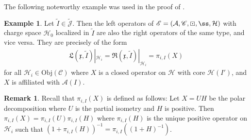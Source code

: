 \documentclass[11pt,b5paper,notitlepage]{article}
\theoremstyle{definition}
\newtheorem{eg}[df]{Example}
\newtheorem{rem}[df]{Remark}
\theoremstyle{plain}
\newcommand{\fk}{\mathfrak}
\newcommand{\mc}{\mathcal}
\newcommand{\wtd}{\widetilde}
\newcommand{\scr}{\mathscr}
\newcommand{\Jtd}{\widetilde{\mathcal J}}
\newcommand{\xk}{\mathfrak x}
\newcommand{\yk}{\mathfrak y}
\newcommand{\pr}{\mathrm {pr}}
\newcommand{\Obj}{\mathrm{Obj}}
\numberwithin{equation}{section}
\begin{document}
\begin{comment}
\begin{rem}
From the proof of Thm. \ref{lb7}, we see that if $(\fk L,\xk,\wtd I,\mc H_i)$ resp. $(\fk R,\yk,\wtd J,\mc H_j)$ is a left resp. right operator of $\scr E=(\mc A,\scr C,\boxdot,\ss,\mc H)$, and if we let $\xi=\fk L(\xk,\wtd I)\Omega$ resp. $\eta=\fk R(\yk,\wtd J)\Omega$, then $\xi\in\mc H_i^\pr(I)$ resp. $\eta\in\mc H_j^\pr(J)$, and for every $\mc H_k\in\Obj(\scr C)$ we have
\begin{align*}
\Psi_{i,k}\fk L(\xk,\wtd I)|_{\mc H_k}=\scr L^\boxtimes(\xi,\wtd I)|_{\mc H_k}\qquad  \Psi_{j,k}\fk R(\yk,\wtd J)|_{\mc H_k}=\scr R^\boxtimes(\eta,\wtd J)|_{\mc H_k}
\end{align*}
where $\Psi$ is the Connes tensorator (cf. Def. \ref{lb1}) and $\scr L^\boxtimes$ and $\scr R^\boxtimes$ are respectively the left and right operators of the Connes categorical extension.
\end{rem}
\end{comment}


The following noteworthy example was used in the proof of \cite[Prop. 2.3.8]{Gui20}. 

\begin{eg}\label{lb85}
Let $\wtd I\in\Jtd$. Then the left operators of $\scr E=(\mc A,\scr C,\boxdot,\ss,\mc H)$ with charge space $\mc H_0$ localized in $\wtd I$ are also the right operators of the same type, and vice versa. They are precisely of the form
\begin{align}\label{eq66}
\fk L(\xk,\wtd I)|_{\mc H_i}=\fk R(\xk,\wtd I)|_{\mc H_i}=\pi_{i,I}(X)
\end{align}
for all $\mc H_i\in\Obj(\scr C)$ where $X$ is a closed operator on $\mc H$ with core $\mc H(I')$, and $X$ is affiliated with $\mc A(I)$.
\end{eg}




\begin{rem}\label{lb84}
Recall that $\pi_{i,I}(X)$ is defined as follows: Let $X=UH$ be the polar decomposition where $U$ is the partial isometry and $H$ is positive. Then $\pi_{i,I}(X)=\pi_{i,I}(U)\pi_{i,I}(H)$ where $\pi_{i,I}(H)$ is the unique positive operator on $\mc H_i$ such that $(1+\pi_{i,I}(H))^{-1}=\pi_{i,I}((1+H)^{-1})$.
\end{rem}
\end{document}
